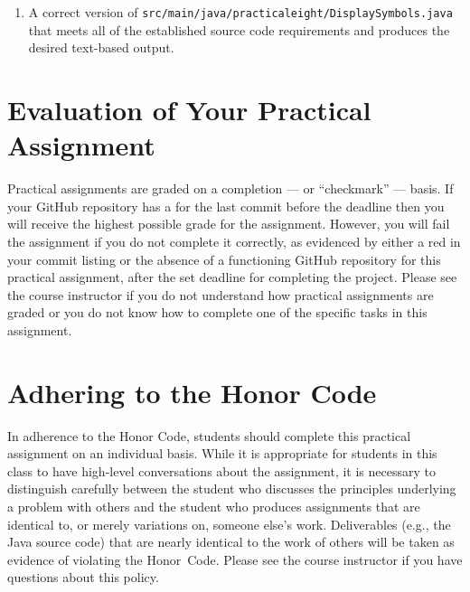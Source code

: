 \documentclass[11pt]{article}
\newcommand{\mainprogramsource}{\lstinline{src/main/java/practicaleight/DisplaySymbols.java}}
\newcommand{\checkmark}{\ding{51}}
\newcommand{\naughtmark}{\ding{55}}
\begin{document}
\begin{enumerate}

\setlength{\itemsep}{0in}

\item A correct version of \mainprogramsource{} that meets all of the established source code requirements and produces
  the desired text-based output.

\end{enumerate}

\section*{Evaluation of Your Practical Assignment}

Practical assignments are graded on a completion --- or ``checkmark'' --- basis. If your GitHub repository has a
\checkmark{} for the last commit before the deadline then you will receive the highest possible grade for the
assignment. However, you will fail the assignment if you do not complete it correctly, as evidenced by either a red
\naughtmark{} in your commit listing or the absence of a functioning GitHub repository for this practical assignment,
after the set deadline for completing the project. Please see the course instructor if you do not understand how
practical assignments are graded or you do not know how to complete one of the specific tasks in this assignment.

\section*{Adhering to the Honor Code}

In adherence to the Honor Code, students should complete this practical assignment on an individual basis. While it is
appropriate for students in this class to have high-level conversations about the assignment, it is necessary to
distinguish carefully between the student who discusses the principles underlying a problem with others and the student
who produces assignments that are identical to, or merely variations on, someone else's work. Deliverables (e.g., the
Java source code) that are nearly identical to the work of others will be taken as evidence of violating the \mbox{Honor
Code}. Please see the course instructor if you have questions about this policy.
\end{document}
